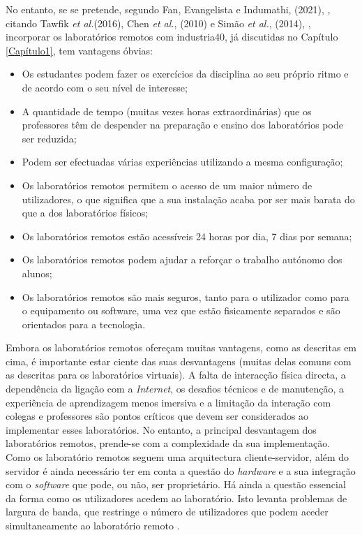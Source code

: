 No entanto, se se pretende, segundo Fan, Evangelista e Indumathi, (2021), \cite{EvaluationRemoteVirtualE-Learning}, citando Tawfik \textit{et al.}(2016)\cite{RemoteLabsImpactVISIR}, Chen \textit{et al.}, (2010)\cite{DevelopingVirtualAndRemoteUndergraduate} e Simão \textit{et al.}, (2014), \cite{RemoteLabsDevelopingCountries}, incorporar os laboratórios remotos com \gls{industria40}, já discutidas no Capítulo \ref{Capítulo1}, tem vantagens óbvias:
\begin{itemize}
    \item Os estudantes podem fazer os exercícios da disciplina ao seu próprio ritmo e de acordo com o seu nível de interesse;
    \item A quantidade de tempo (muitas vezes horas extraordinárias) que os professores têm de despender na preparação e ensino dos laboratórios pode ser reduzida;
    \item Podem ser efectuadas várias experiências utilizando a mesma configuração;
    \item Os laboratórios remotos permitem o acesso de um maior número de utilizadores, o que significa que a sua instalação acaba por ser mais barata do que a dos laboratórios físicos;
    \item Os laboratórios remotos estão acessíveis 24 horas por dia, 7 dias por semana;
    \item Os laboratórios remotos podem ajudar a reforçar o trabalho autónomo dos alunos;
    \item Os laboratórios remotos são mais seguros, tanto para o utilizador como para o equipamento ou software, uma vez que estão fisicamente separados e são orientados para a tecnologia.
\end{itemize}

Embora os laboratórios remotos ofereçam muitas vantagens, como as descritas em cima, é importante estar ciente das suas desvantagens (muitas delas comuns com as descritas para os laboratórios virtuais). A falta de interacção física directa, a dependência da ligação com a \textit{Internet}, os desafios técnicos e de manutenção, a experiência de aprendizagem menos imersiva e a limitação da interação com colegas e professores são pontos críticos que devem ser considerados ao implementar esses laboratórios. No entanto, a principal desvantagem dos laboratórios remotos, prende-se com a complexidade da sua implementação. Como os \acrshort{laboratório remoto}s seguem uma arquitectura cliente-servidor, além do servidor é ainda necessário ter em conta a questão do \textit{hardware} e a sua integração com o \textit{software} que pode, ou não, ser proprietário. Há ainda a questão essencial da forma como os utilizadores acedem ao laboratório. Isto levanta problemas de largura de banda, que restringe o número de utilizadores que podem aceder simultaneamente ao \acrshort{laboratório remoto} \cite{HERADIO20161}.

